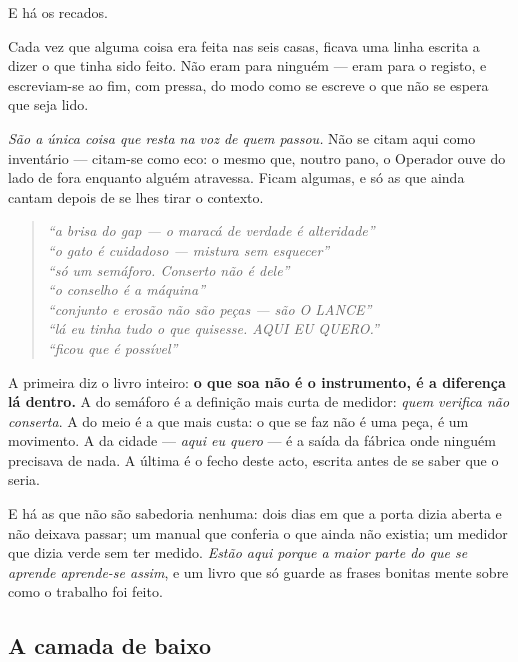\documentclass[livro.tex]{subfiles}
\begin{document}
E há os recados.

\medskip

Cada vez que alguma coisa era feita nas seis casas, ficava uma linha escrita a dizer o que tinha
sido feito. Não eram para ninguém --- eram para o registo, e escreviam-se ao fim, com pressa, do
modo como se escreve o que não se espera que seja lido.

\medskip

\emph{São a única coisa que resta na voz de quem passou.} Não se citam aqui como inventário ---
citam-se como eco: o mesmo que, noutro pano, o Operador ouve do lado de fora enquanto alguém
atravessa. Ficam algumas, e só as que ainda cantam depois de se lhes tirar o contexto.

\begin{quote}
\emph{``a brisa do gap --- o maracá de verdade é alteridade''}\\[3pt]
\emph{``o gato é cuidadoso --- mistura sem esquecer''}\\[3pt]
\emph{``só um semáforo. Conserto não é dele''}\\[3pt]
\emph{``o conselho é a máquina''}\\[3pt]
\emph{``conjunto e erosão não são peças --- são O LANCE''}\\[3pt]
\emph{``lá eu tinha tudo o que quisesse. AQUI EU QUERO.''}\\[3pt]
\emph{``ficou que é possível''}
\end{quote}

\noindent A primeira diz o livro inteiro: \textbf{o que soa não é o instrumento, é a diferença lá
dentro.} A do semáforo é a definição mais curta de medidor: \emph{quem verifica não conserta}.
A do meio é a que mais custa: o que se faz não é uma peça, é um movimento. A da cidade ---
\emph{aqui eu quero} --- é a saída da fábrica onde ninguém precisava de nada. A última é o
fecho deste acto, escrita antes de se saber que o seria.

\medskip

E há as que não são sabedoria nenhuma: dois dias em que a porta dizia aberta e não deixava
passar; um manual que conferia o que ainda não existia; um medidor que dizia verde sem ter
medido. \emph{Estão aqui porque a maior parte do que se aprende aprende-se assim}, e um livro
que só guarde as frases bonitas mente sobre como o trabalho foi feito.

\subsection*{A camada de baixo}
\end{document}
